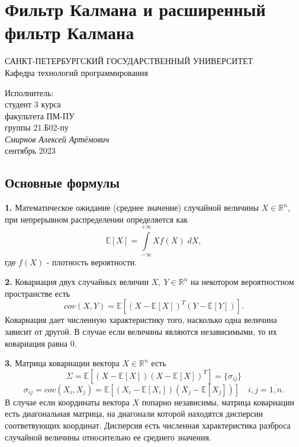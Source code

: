 \documentclass[12pt, a4paper]{article}
\begin{document}
\vspace*{2cm}
\section*{Фильтр Калмана и расширенный фильтр Калмана}
\vspace*{1cm}

\begin{center}
САНКТ-ПЕТЕРБУРГСКИЙ ГОСУДАРСТВЕННЫЙ УНИВЕРСИТЕТ\\
Кафедра технологий программирования
\end{center}

\vspace*{8cm}
 
\begin{flushright}
Исполнитель:\\
студент 3 курса \\
факультета ПМ-ПУ \\
группы 21.Б02-пу \\
\textit{Смирнов Алексей Артёмович}\\
\vspace*{1cm}
сентябрь 2023
\end{flushright}

\newpage

\subsection*{Основные формулы}

\quad \textbf{1.} Математическое ожидание (среднее значение) случайной величины $X \in \mathds{R}^n$, при непрерывном распределении определяется как \[\mathds{E}[X] = \int\limits_{-\infty}^{+\infty} Xf(X) \; dX, \]
где $f(X)$ - плотность вероятности.

\textbf{2.} Ковариация двух случайных величин $X, \:Y \in \mathds{R}^n$ на некотором вероятностном пространстве есть 
\[cov(X, Y) =  \mathds{E}[(X - \mathds{E}[X])^T (Y - \mathds{E}[Y])].\]
Ковариация дает численную характеристику того, насколько одна величина зависит от другой. В случае если величины являются независимыми, то их ковариация равна 0.

\textbf{3.} Матрица ковариации вектора $X \in \mathds{R}^n$ есть
\[\Sigma = \mathds{E}[(X - \mathds{E}[X])(X - \mathds{E}[X])^T] = \{\sigma_{ij}\}\] 
\[\sigma_{ij} = cov(X_i, X_j) = \mathds{E}[(X_i - \mathds{E}[X_i]) (X_j - \mathds{E}[X_j])] \quad i, j = \overline{1, n}.\]
В случае если координаты вектора $X$ попарно независимы, матрица ковариации есть диагональная матрица, на диагонали которой находятся дисперсии соответвующих координат. Дисперсия есть численная характеристика разброса случайной величины относительно ее среднего значения.
\end{document}
